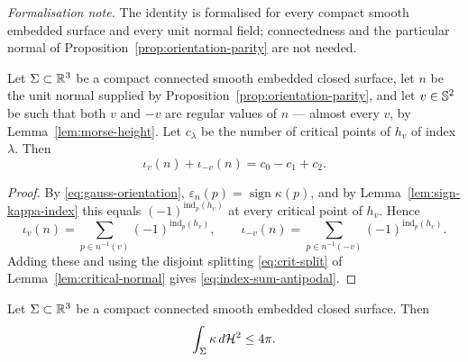 \medskip\noindent\emph{Formalisation note.} The identity is formalised for every compact smooth embedded surface and every unit normal field; connectedness and the particular normal of Proposition~\ref{prop:orientation-parity} are not needed.

\begin{proposition}
\label{prop:index-sum-antipodal}
Let $\Sigma\subset\mathbb R^3$ be a compact connected smooth embedded closed
surface, let $n$ be the unit normal supplied by
Proposition~\ref{prop:orientation-parity}, and let $v\in\mathbb S^2$ be such that
both $v$ and $-v$ are regular values of $n$ --- almost every $v$, by
Lemma~\ref{lem:morse-height}.  Let $c_\lambda$ be the number of critical
points of $h_v$ of index $\lambda$.  Then
\begin{equation}\label{eq:index-sum-antipodal}
  \iota_v(n)+\iota_{-v}(n)=c_0-c_1+c_2 .
\end{equation}
\end{proposition}

\begin{proof}
By \eqref{eq:gauss-orientation},
$\varepsilon_n(p)=\operatorname{sign}\kappa(p)$, and by
Lemma~\ref{lem:sign-kappa-index} this equals $(-1)^{\mathrm{ind}_p(h_v)}$ at
every critical point of $h_v$.  Hence
\[
  \iota_v(n)=\!\!\sum_{p\in n^{-1}(v)}\!\!(-1)^{\mathrm{ind}_p(h_v)},
  \qquad
  \iota_{-v}(n)=\!\!\sum_{p\in n^{-1}(-v)}\!\!(-1)^{\mathrm{ind}_p(h_v)} .
\]
Adding these and using the disjoint splitting \eqref{eq:crit-split} of
Lemma~\ref{lem:critical-normal} gives \eqref{eq:index-sum-antipodal}.
\end{proof}

\begin{theorem}\label{thm:total-curvature-bound}
Let $\Sigma\subset\mathbb R^3$ be a compact connected smooth embedded closed
surface.  Then
\begin{equation}\label{eq:total-curvature-bound}
  \int_\Sigma\kappa\,d\mathcal H^2\le4\pi .
\end{equation}
\end{theorem}

